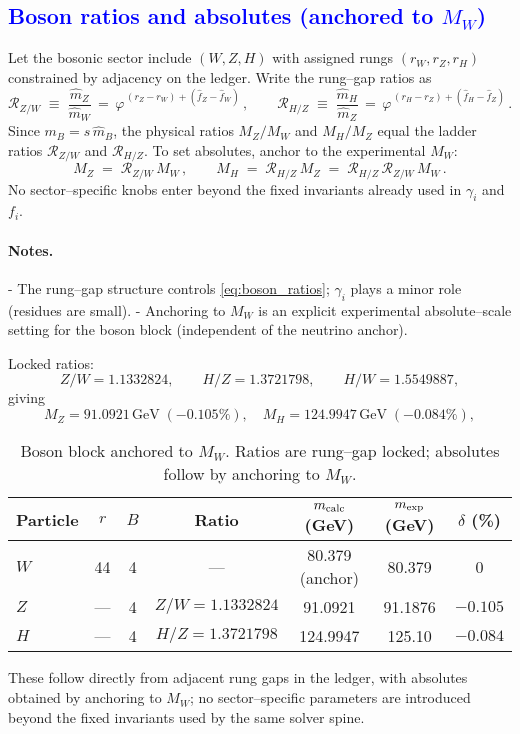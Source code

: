 \documentclass[%
 amsmath,amssymb,
 aps,
prb,
floatfix, showkeys
]{revtex4-2}
\newcommand{\modif}[1]{\textcolor{blue}{#1}}
\begin{document}
{\modif{
\subsection{Boson ratios and absolutes (anchored to $M_W$)}
\label{subsec:bosons}
}}
Let the bosonic sector include $(W,Z,H)$ with assigned rungs $(r_W,r_Z,r_H)$ constrained by adjacency on the ledger.
Write the rung--gap ratios as
\begin{equation}
  \mathcal{R}_{Z/W} \;\equiv\; \frac{\widehat m_Z}{\widehat m_W}
  \,=\, \varphi^{\,(r_Z-r_W) + (\widehat f_Z - \widehat f_W)}\,,\qquad
  \mathcal{R}_{H/Z} \;\equiv\; \frac{\widehat m_H}{\widehat m_Z}
  \,=\, \varphi^{\,(r_H-r_Z) + (\widehat f_H - \widehat f_Z)}\,.
  \label{eq:boson_ratios}
\end{equation}
Since $m_B=s\,\widehat m_B$, the physical ratios $M_Z/M_W$ and $M_H/M_Z$ equal the ladder ratios $\mathcal{R}_{Z/W}$ and $\mathcal{R}_{H/Z}$.
To set absolutes, anchor to the experimental $M_W$:
\begin{equation}
  M_Z \;=\; \mathcal{R}_{Z/W}\,M_W\,,\qquad
  M_H \;=\; \mathcal{R}_{H/Z}\,M_Z \;=\; \mathcal{R}_{H/Z}\,\mathcal{R}_{Z/W}\,M_W\,.
  \label{eq:boson_absolutes}
\end{equation}
No sector--specific knobs enter beyond the fixed invariants already used in $\gamma_i$ and $f_i$.

\paragraph{Notes.}
- The rung--gap structure controls \eqref{eq:boson_ratios}; $\gamma_i$ plays a minor role (residues are small).
- Anchoring to $M_W$ is an explicit experimental absolute--scale setting for the boson block (independent of the neutrino anchor).

Locked ratios:
\[
Z/W=1.1332824,\qquad H/Z=1.3721798,\qquad H/W=1.5549887,
\]
giving
\[
M_Z=91.0921\,\text{GeV}\;(-0.105\%),\quad
M_H=124.9947\,\text{GeV}\;(-0.084\%),
\]
\begin{table}[H]
\caption{Boson block anchored to $M_W$. Ratios are rung--gap locked; absolutes follow by anchoring to $M_W$.}
\label{tab:bosons}
\begin{tabular}{l c c c c c c}
\hline
Particle & $r$ & $B$ & Ratio & $m_{\rm calc}$ (GeV) & $m_{\rm exp}$ (GeV) & $\delta$ (\%) \\
\hline
$W$ & 44  & 4 & ---                 & 80.379 (anchor) & 80.379   & 0 \\
$Z$ & --- & 4 & $Z/W=1.1332824$    & 91.0921         & 91.1876  & $-0.105$ \\
$H$ & --- & 4 & $H/Z=1.3721798$    & 124.9947        & 125.10   & $-0.084$ \\
\hline
\end{tabular}
\end{table}
These follow directly from adjacent rung gaps in the ledger, with absolutes obtained by anchoring to $M_W$; no sector--specific parameters are introduced beyond the fixed invariants used by the same solver spine.
\end{document}
